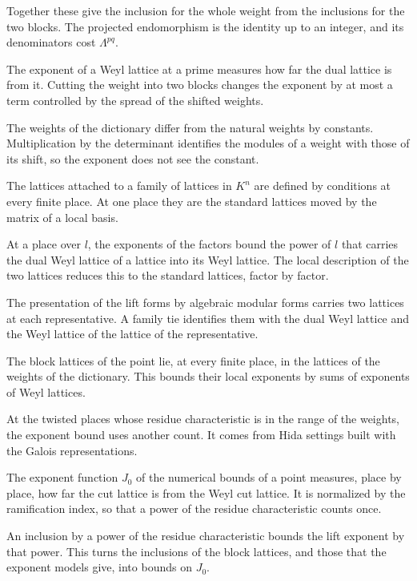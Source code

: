 Together these give the inclusion for the whole weight from the inclusions for the two blocks. The
projected endomorphism is the identity up to an integer, and its denominators cost $\Lambda^{pq}$.

The exponent of a Weyl lattice at a prime measures how far the dual lattice is from it. Cutting the
weight into two blocks changes the exponent by at most a term controlled by the spread of the
shifted weights.

The weights of the dictionary differ from the natural weights by constants. Multiplication by the
determinant identifies the modules of a weight with those of its shift, so the exponent does not see the
constant.

The lattices attached to a family of lattices in $K^n$ are defined by conditions at every finite place.
At one place they are the standard lattices moved by the matrix of a local basis.

At a place over $l$, the exponents of the factors bound the power of $l$ that carries the dual Weyl
lattice of a lattice into its Weyl lattice. The local description of the two lattices reduces this to
the standard lattices, factor by factor.

The presentation of the lift forms by algebraic modular forms carries two lattices at each
representative. A family tie identifies them with the dual Weyl lattice and the Weyl lattice of the
lattice of the representative.

The block lattices of the point lie, at every finite place, in the lattices of the weights of the
dictionary. This bounds their local exponents by sums of exponents of Weyl lattices.

At the twisted places whose residue characteristic is in the range of the weights, the exponent
bound uses another count. It comes from Hida settings built with the Galois representations.

The exponent function $J_0$ of the numerical bounds of a point measures, place by place, how far the
cut lattice is from the Weyl cut lattice. It is normalized by the ramification index, so that a power of
the residue characteristic counts once.

An inclusion by a power of the residue characteristic bounds the lift exponent by that power. This
turns the inclusions of the block lattices, and those that the exponent models give, into bounds on
$J_0$.


